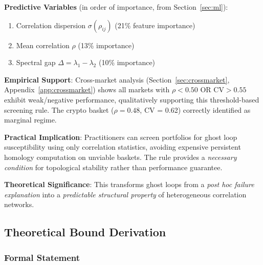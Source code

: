 \textbf{Predictive Variables} (in order of importance, from Section~\ref{sec:ml}):
\begin{enumerate}
\item Correlation dispersion $\sigma(\rho_{ij})$ (21\% feature importance)
\item Mean correlation $\rho$ (13\% importance)
\item Spectral gap $\Delta = \lambda_1 - \lambda_2$ (10\% importance)
\end{enumerate}

\textbf{Empirical Support}: Cross-market analysis (Section~\ref{sec:crossmarket}, Appendix~\ref{app:crossmarket}) shows all markets with $\rho < 0.50$ OR $\text{CV} > 0.55$ exhibit weak/negative performance, qualitatively supporting this threshold-based screening rule. The crypto basket ($\rho = 0.48$, CV = 0.62) correctly identified as marginal regime.

\textbf{Practical Implication}: Practitioners can screen portfolios for ghost loop susceptibility using only correlation statistics, avoiding expensive persistent homology computation on unviable baskets. The rule provides a \textit{necessary condition} for topological stability rather than performance guarantee.

\textbf{Theoretical Significance}: This transforms ghost loops from a \textit{post hoc failure explanation} into a \textit{predictable structural property} of heterogeneous correlation networks.

\subsection{Theoretical Bound Derivation}

\subsubsection{Formal Statement}

